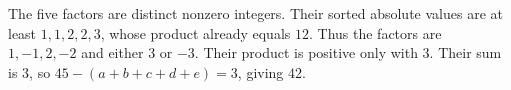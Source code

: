The five factors are distinct nonzero integers. Their sorted absolute values are at least $1,1,2,2,3$, whose product already equals $12$. Thus the factors are $1,-1,2,-2$ and either $3$ or $-3$. Their product is positive only with $3$. Their sum is $3$, so $45-(a+b+c+d+e)=3$, giving $\boxed{42}$.
